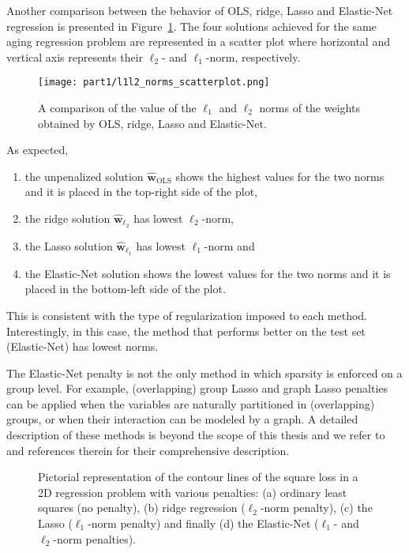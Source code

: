 			Another comparison between the behavior of OLS, ridge, Lasso and Elastic-Net regression is presented in Figure~\ref{fig:l1l2_norms_scatterplot}. The four solutions achieved for the same aging regression problem are represented in a scatter plot where horizontal and vertical axis represents their $\ell_2$- and $\ell_1$-norm, respectively.
			\begin{figure}[!h]
				\centering
				\texttt{[image: part1/l1l2\_norms\_scatterplot.png]}
				\caption{A comparison of the value of the $\ell_1$ and $\ell_2$ norms of the weights obtained by OLS, ridge, Lasso and Elastic-Net.} \label{fig:l1l2_norms_scatterplot}
		  \end{figure}
			As expected,
			\begin{enumerate}
				\item the unpenalized solution $\bm{\hat w}_{\text{OLS}}$ shows the highest values for the two norms and it is placed in the top-right side of the plot,
				\item the ridge solution $\bm{\hat w}_{\ell_2}$ has lowest $\ell_2$-norm,
				\item the Lasso solution $\bm{\hat w}_{\ell_1}$ has lowest $\ell_1$-norm and
				\item the Elastic-Net solution shows the lowest values for the two norms and it is placed in the bottom-left side of the plot.
		  \end{enumerate}
			This is consistent with the type of regularization imposed to each method. Interestingly, in this case, the method that performs better on the test set (Elastic-Net) has lowest norms.

			The Elastic-Net penalty is not the only method in which sparsity is enforced on a group level. For example, (overlapping) group Lasso and graph Lasso penalties can be applied when the variables are naturally partitioned in (overlapping) groups, or when their interaction can be modeled by a graph. A detailed description of these methods is beyond the scope of this thesis and we refer to~\cite{jacob2009group, witten2009covariance} and references therein for their comprehensive description.

			\begin{figure}[]
				\centering
				\hfill%
				\caption{Pictorial representation of the contour lines of the square loss in a 2D regression problem with various penalties: (a) ordinary least squares (no penalty), (b) ridge regression ($\ell_2$-norm penalty), (c) the Lasso ($\ell_1$-norm penalty) and finally (d) the Elastic-Net ($\ell_1$- and $\ell_2$-norm penalties).} \label{fig:square_loss_penalties}
			\end{figure}

